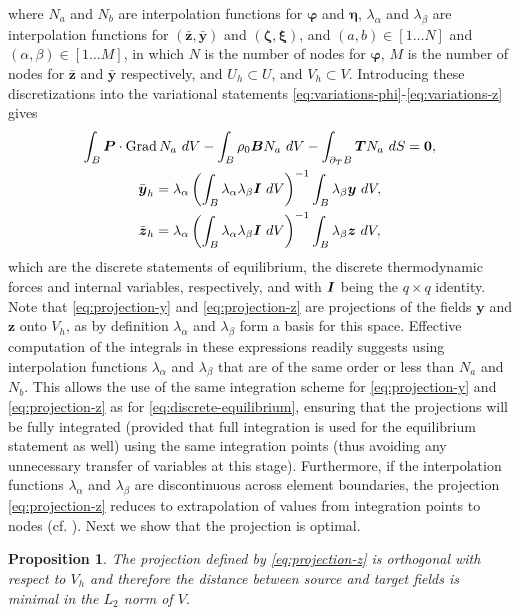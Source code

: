 \documentclass[12pt]{article}
\newcommand{\mbs}[1]{\boldsymbol{#1}}
\newtheorem*{proposition}{Proposition}
\def\bP{{\mbs{P}}} \def\bQ{{\mbs{Q}}} \def\bR{{\mbs{R}}}
\def\by{{\mbs{y}}} \def\bz{{\mbs{z}}}
\def\bzeta{{\mbs{\zeta}}}
\def\beeta{{\mbs{\eta}}}
\def\bxi{{\mbs{\xi}}}
\def\bvarphi{{\mbs{\varphi}}}
\DeclareMathOperator{\Grad}{Grad}
\begin{document}
where $N_a$ and $N_b$ are interpolation functions for $\bvarphi$ and
$\beeta$, $\lambda_\alpha$ and $\lambda_\beta$ are interpolation
functions for $(\bar{\bz}, \bar{\by})$ and $(\bzeta, \bxi)$, and
$(a,b) \in [1 \ldots N]$ and $(\alpha, \beta) \in [1 \ldots M]$, in
which $N$ is the number of nodes for $\bvarphi$, $M$ is the number of
nodes for $\bar{\bz}$ and $\bar{\by}$ respectively, and $U_h \subset
U$, and $V_h \subset V$. Introducing these discretizations
into the variational statements
\eqref{eq:variations-phi}-\eqref{eq:variations-z} gives
\begin{gather}
  \int_B \bP \cdot \Grad N_a \ dV
  -
  \int_B \rho_0 \bB N_a \ dV
  -
  \int_{\partial_T B} \bT N_a \ dS
  =
  \mathbf{0}, \label{eq:discrete-equilibrium}
  \\
  \bar{\by}_h
  =
  \lambda_\alpha
  \left(
  \int_B \lambda_\alpha \lambda_\beta \bI \ dV
  \right)^{-1}
  \int_B \lambda_\beta \by \ dV, \label{eq:projection-y}
  \\
  \bar{\bz}_h
  =
  \lambda_\alpha
  \left(
  \int_B \lambda_\alpha \lambda_\beta \bI \ dV
  \right)^{-1}
  \int_B \lambda_\beta \bz \ dV, \label{eq:projection-z}
\end{gather}
which are the discrete statements of equilibrium, the discrete
thermodynamic forces and internal variables, respectively, and with
$\bI$ being the $q \times q$ identity. Note that
\eqref{eq:projection-y} and \eqref{eq:projection-z} are projections of
the fields $\by$ and $\bz$ onto $V_h$, as by definition
$\lambda_\alpha$ and $\lambda_\beta$ form a basis for this space.
Effective computation of the integrals in these expressions readily
suggests using interpolation functions $\lambda_\alpha$ and
$\lambda_\beta$ that are of the same order or less than $N_a$ and
$N_b$. This allows the use of the same integration scheme for
\eqref{eq:projection-y} and \eqref{eq:projection-z} as for
\eqref{eq:discrete-equilibrium}, ensuring that the projections will be
fully integrated (provided that full integration is used for the
equilibrium statement as well) using the same integration points (thus
avoiding any unnecessary transfer of variables at this
stage). Furthermore, if the interpolation functions $\lambda_\alpha$
and $\lambda_\beta$ are discontinuous across element boundaries, the
projection \eqref{eq:projection-z} reduces to extrapolation of values
from integration points to nodes (cf. \citet{Ortiz.Quigley:1991,
  Radovitzky.Ortiz:1999}).  Next we show that the projection is
optimal.

\begin{proposition}
  The projection defined by \eqref{eq:projection-z} is orthogonal with
  respect to $V_h$ and therefore the distance between source and
  target fields is minimal in the $L_2$ norm of $V$.
\end{proposition}
\end{document}
